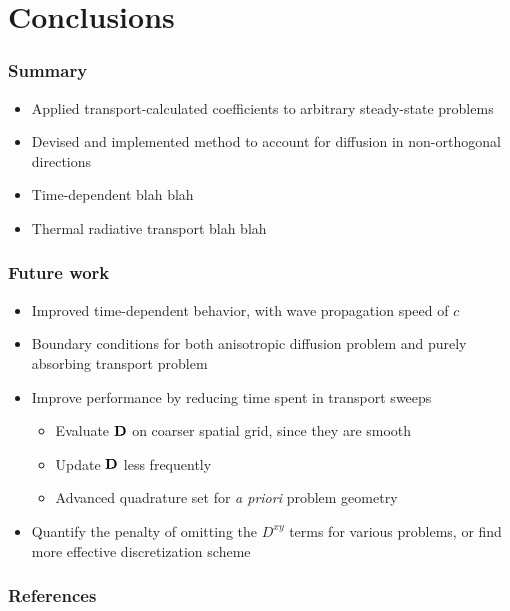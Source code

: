 \documentclass{beamer}
\newcommand{\Dtens}{\mat{D}}
\begin{document}
\section{Conclusions}
\begin{frame}
  \frametitle{Summary}
  \begin{itemize}
    \item Applied transport-calculated coefficients to arbitrary steady-state
      problems
    \item Devised and implemented method to account for diffusion in
      non-orthogonal directions
    \item Time-dependent blah blah
    \item Thermal radiative transport blah blah
  \end{itemize}
\end{frame}
\begin{frame}
  \frametitle{Future work}
  \begin{itemize}
    \item Improved time-dependent behavior, with wave propagation speed of $c$
    \item Boundary conditions for both anisotropic diffusion problem and
      purely absorbing transport problem
    \item Improve performance by reducing time spent in transport sweeps
      \begin{itemize}
        \item Evaluate $\Dtens$ on coarser spatial grid, since they are smooth
        \item Update $\Dtens$ less frequently
        \item Advanced quadrature set for \emph{a priori} problem geometry
      \end{itemize}
    \item Quantify the penalty of omitting the $D^{xy}$ terms for various
      problems, or find more effective discretization scheme
  \end{itemize}
\end{frame}
\appendix
\begin{frame}
  \frametitle{References}


\end{frame}

\end{document}
